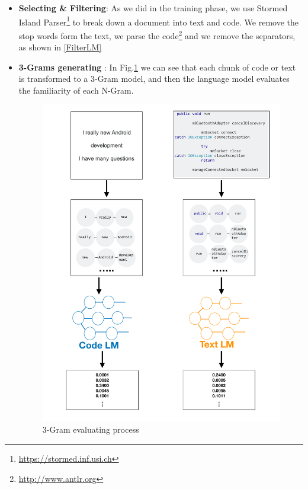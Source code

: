 \documentclass[12pt,mscthesis]{usiinfthesis}
\begin{document}
	\begin{itemize}
		\item \textbf{Selecting \& Filtering}: As we did in the training phase, we use Stormed Island Parser\footnote{\url{https://stormed.inf.usi.ch}} \cite{Ponz2015a} to break down a document into text and code. We remove the stop words form the text, we parse the code\footnote{\url{http://www.antlr.org}} and we remove the separators, as shown in \cref{FilterLM}
		\item \textbf{3-Grams generating }: In Fig.\ref{3gram-evaluating} we can see that each chunk of code or text is transformed to a 3-Gram model, and then the language model evaluates the familiarity of each N-Gram.
			

			\begin{figure}[htbp]
			\centering
			\includegraphics[width=\textwidth]{3gram-evaluating}
			\caption{3-Gram evaluating process}
			\label{3gram-evaluating}
			\end{figure}	
	

\end{itemize}
\end{document}
